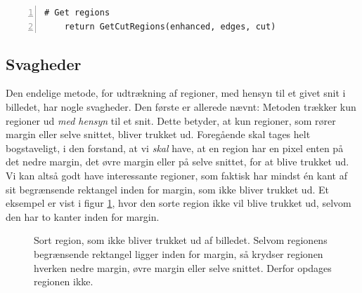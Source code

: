 {\begin{lstlisting}[caption={Fuld udtrækning af regioner i et arbitært
    billede.},captionpos=b,label={pseudo_udtraek_all},numbers=left,
    frame=tb, breaklines=false, float=h]
    # Get regions
    return GetCutRegions(enhanced, edges, cut)
\end{lstlisting}

\subsection{Svagheder\label{subsec_svagheder}}
Den endelige metode, for udtrækning af regioner, med hensyn til et givet
snit i billedet, har nogle svagheder. Den første er allerede nævnt:
Metoden trækker kun regioner ud \emph{med hensyn} til et snit. Dette
betyder, at kun regioner, som rører margin eller selve snittet, bliver
trukket ud. Foregående skal tages helt bogstaveligt, i den forstand, at
vi \emph{skal} have, at en region har en pixel enten på det nedre
margin, det øvre margin eller på selve snittet, for at blive trukket ud.
Vi kan altså godt have interessante regioner, som faktisk har mindst én
kant af sit begrænsende rektangel inden for margin, som ikke bliver
trukket ud. Et eksempel er vist i figur \ref{respect_to_cut}, hvor den
sorte region ikke vil blive trukket ud, selvom den har to kanter inden
for margin.

\begin{figure}[h]
    \setlength\fboxsep{0pt}
    \setlength\fboxrule{0.5pt}
    \centering
    \caption[]{Sort region, som ikke bliver trukket ud af billedet.
    Selvom regionens begrænsende rektangel ligger inden for margin, så
    krydser regionen hverken nedre margin, øvre margin eller selve
    snittet. Derfor opdages regionen ikke.}
    \label{respect_to_cut}
\end{figure}

}
